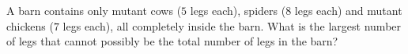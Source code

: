 A barn contains only mutant cows ($5$ legs each), spiders ($8$ legs each) and mutant chickens ($7$ legs each), all completely inside the barn. What is the largest number of legs that cannot possibly be the total number of legs in the barn?
